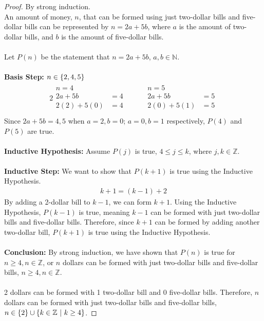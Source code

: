 \documentclass[article, 11pt]{article}
\DeclarePairedDelimiter\set{\{}{\}}
\newcommand{\unite}{\cup}
\newcommand{\ints}{\mathbb{Z}}
\newcommand{\nats}{\mathbb{N}}
\begin{document}
\begin{proof}
    By strong induction. \\
    An amount of money, $n$, that can be formed using just two-dollar bills and five-dollar bills can be represented by $n=2a+5b$, where $a$ is the amount of two-dollar bills, and $b$ is the amount of five-dollar bills. \\
    \\
    Let $P(n)$ be the statement that $n=2a+5b$, $a, b \in \nats$. \\
    \\
    \textbf{Basis Step: $n \in \set*{2, 4, 5}$}
    \begin{alignat*}{2}
        \begin{aligned}
            n = 4 \\
            2a + 5b &= 4 \\
            2(2) + 5(0) &= 4 \\
        \end{aligned} \quad &&
        \begin{aligned}
            n = 5 \\
            2a + 5b &= 5 \\
            2(0) + 5(1) &= 5 \\
        \end{aligned}
    \end{alignat*}
    Since $2a+5b=4,5$ when $a=2,b=0$; $a=0,b=1$ respectively, $P(4)$ and $P(5)$ are true. \\
    \\
    \textbf{Inductive Hypothesis:} Assume $P(j)$ is true, $4 \leq j \leq k$, where $j,k \in \ints$. \\
    \\
    \textbf{Inductive Step:} We want to show that $P(k+1)$ is true using the Inductive Hypothesis.
    \begin{align*}
        k+1 = (k - 1) + 2 
    \end{align*}   
    By adding a 2-dollar bill to $k-1$, we can form $k+1$. Using the Inductive Hypothesis, $P(k-1)$ is true, meaning $k-1$ can be formed with just two-dollar bills and five-dollar bills. Therefore, since $k+1$ can be formed by adding another two-dollar bill, $P(k+1)$ is true using the Inductive Hypothesis. \\
    \\
    \textbf{Conclusion:} By strong induction, we have shown that $P(n)$ is true for $n \geq 4, n \in \ints$, or $n$ dollars can be formed with just two-dollar bills and five-dollar bills, $n \geq 4, n \in \ints$. \\
    \\
    2 dollars can be formed with 1 two-dollar bill and 0 five-dollar bills. Therefore, $n$ dollars can be formed with just two-dollar bills and five-dollar bills, $n \in \set*{2} \unite \set*{k \in \ints \ | \ k \geq 4}$.
\end{proof}
\end{document}
